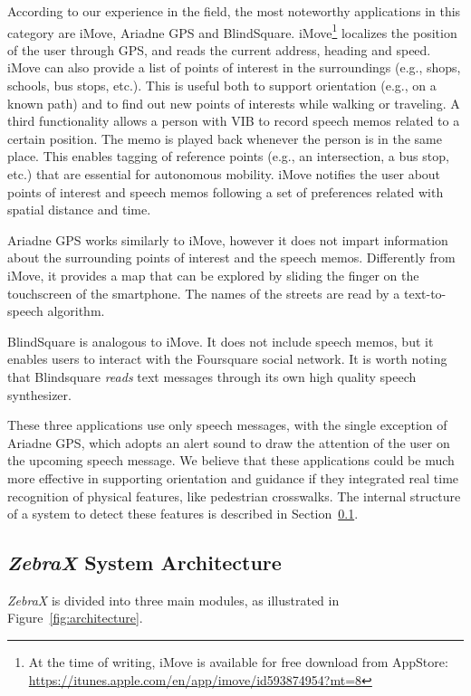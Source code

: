 \documentclass{article}
\newcommand{\zebra}{\emph{ZebraX}}
\begin{document}
According to our experience in the field, the most noteworthy applications in this category are iMove, Ariadne GPS and BlindSquare.
iMove\footnote{At the time of writing, iMove is available for free download from AppStore: \url{https://itunes.apple.com/en/app/imove/id593874954?mt=8}} localizes the position of the user through GPS, and reads the current address, heading and speed.
iMove can also provide a list of points of interest in the surroundings (e.g., shops, schools, bus stops, etc.).
This is useful both to support orientation (e.g., on a known path) and to find out new points of interests while walking or traveling.
A third functionality allows a person with VIB to record speech memos related to a certain position.
The memo is played back whenever the person is in the same place.
This enables tagging of reference points (e.g., an intersection, a bus stop, etc.) that are essential for autonomous mobility.
iMove notifies the user about points of interest and speech memos following a set of preferences related with spatial distance and time. 

Ariadne GPS works similarly to iMove, however it does not impart information about the surrounding points of interest and the speech memos.
Differently from iMove, it provides a map that can be explored by sliding the finger on the touchscreen of the smartphone.
The names of the streets are read by a text-to-speech algorithm.

BlindSquare is analogous to iMove. It does not include speech memos, but it enables users to interact with the Foursquare social network.
It is worth noting that Blindsquare \emph{reads} text messages through its own high quality speech synthesizer.

These three applications use only speech messages, with the single exception of Ariadne GPS, which adopts an alert sound to draw the attention of the user on the upcoming speech message.
We believe that these applications could be much more effective in supporting orientation and guidance if they integrated real time recognition of physical features, like pedestrian crosswalks.
The internal structure of a system to detect these features is described in Section~\ref{sub:architecture}.


\subsection{\zebra{} System Architecture}
\label{sub:architecture}
\zebra{} is divided into three main modules, as illustrated in Figure~\ref{fig:architecture}.
\end{document}
